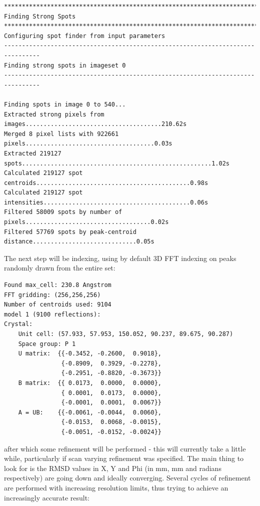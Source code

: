 \documentclass[a4paper, 11pt]{article}
\begin{document}
{\small
\begin{verbatim}
********************************************************************************
Finding Strong Spots
********************************************************************************
Configuring spot finder from input parameters
--------------------------------------------------------------------------------
Finding strong spots in imageset 0
--------------------------------------------------------------------------------

Finding spots in image 0 to 540...
Extracted strong pixels from images......................................210.62s
Merged 8 pixel lists with 922661 pixels....................................0.03s
Extracted 219127 spots.....................................................1.02s
Calculated 219127 spot centroids...........................................0.98s
Calculated 219127 spot intensities.........................................0.06s
Filtered 58009 spots by number of pixels...................................0.02s
Filtered 57769 spots by peak-centroid distance.............................0.05s
\end{verbatim}
}

\noindent
The next step will be indexing, using by default 3D FFT indexing on
peaks randomly drawn from the entire set:

{\small
\begin{verbatim}
Found max_cell: 230.8 Angstrom
FFT gridding: (256,256,256)
Number of centroids used: 9104
model 1 (9100 reflections):
Crystal:
    Unit cell: (57.933, 57.953, 150.052, 90.237, 89.675, 90.287)
    Space group: P 1
    U matrix:  {{-0.3452, -0.2600,  0.9018},
                {-0.8909,  0.3929, -0.2278},
                {-0.2951, -0.8820, -0.3673}}
    B matrix:  {{ 0.0173,  0.0000,  0.0000},
                { 0.0001,  0.0173,  0.0000},
                {-0.0001,  0.0001,  0.0067}}
    A = UB:    {{-0.0061, -0.0044,  0.0060},
                {-0.0153,  0.0068, -0.0015},
                {-0.0051, -0.0152, -0.0024}}
\end{verbatim}
}

\noindent
after which some refinement will be performed - this will currently
take a little while, particularly if scan varying refinement was
specified. The main thing to look for is the RMSD values in X, Y and
Phi (in mm, mm and radians respectively) are going down and ideally
converging. Several cycles of refinement are performed with increasing
resolution limits, thus trying to achieve an increasingly accurate
result:
\end{document}
